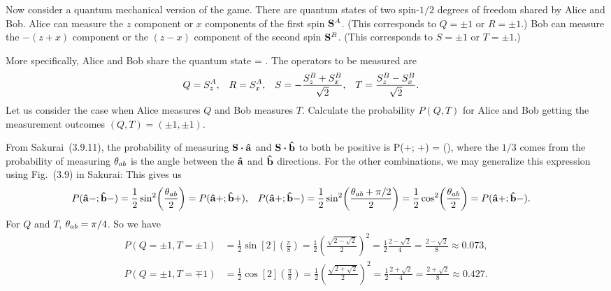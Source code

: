 \begin{problem}
	Now consider a quantum mechanical version of the game.  There are quantum states of two spin-$1/2$ degrees of freedom shared by Alice and Bob.  Alice can measure the $z$ component or $x$ components of the first spin $\vb{S}^A$.  (This corresponds to $Q = \pm1$ or $R = \pm1$.)  Bob can measure the $-(z+x)$ component or the $(z-x)$ component of the second spin $\vb{S}^B$.  (This corresponds to $S = \pm1$ or $T = \pm1$.)
	
	More specifically, Alice and Bob share the quantum state
	\beq
		\kpsi = .
	\eeq
	The operators to be measured are
	\begin{align*}
		Q &= S_z^A, &
		R &= S_x^A, &
		S &= -\frac{S_z^B + S_x^B}{\sqrt{2}}, &
		T &= \frac{S_z^B - S_x^B}{\sqrt{2}}.
	\end{align*}
	Let us consider the case when Alice measures $Q$ and Bob measures $T$.  Calculate the probability $P(Q, T)$ for Alice and Bob getting the measurement outcomes $(Q, T) = (\pm1, \pm1)$.
\end{problem}

\begin{solution}
	From Sakurai~(3.9.11), the probability of measuring $\vS \vdot \ah$ and $\vS \vdot \bh$ to both be positive is
	\beq
		P(\ah+; \bh+) =  \sin[2](),
	\eeq
	where the $1/3$ comes from the probability of measuring $\theta_{ab}$ is the angle between the $\vb{\hat{a}}$ and $\vb{\hat{b}}$ directions.  For the other combinations, we may generalize this expression using Fig.~(3.9) in Sakurai:
	This gives us
	\begin{align} \label{probs}
		P(\vb{\hat{a}}-; \vb{\hat{b}}-) &= \frac{1}{2} \sin[2](\frac{\theta_{ab}}{2}) = P(\vb{\hat{a}}+; \vb{\hat{b}}+), &
		P(\vb{\hat{a}}+; \vb{\hat{b}}-) &= \frac{1}{2} \sin[2](\frac{\theta_{ab} + \pi/2}{2}) = \frac{1}{2} \cos[2](\frac{\theta_{ab}}{2}) = P(\vb{\hat{a}}+; \vb{\hat{b}}-).
	\end{align}
	For $Q$ and $T$, $\theta_{ab} = \pi / 4$.  So we have
	\begin{align*}
		P(Q=\pm1, T=\pm1) &= \frac{1}{2} \sin[2](\frac{\pi}{8})
		= \frac{1}{2} \left( \frac{\sqrt{2 - \sqrt{2}}}{2} \right)^2
		= \frac{1}{2} \frac{2 - \sqrt{2}}{4}
		= \frac{2 - \sqrt{2}}{8}
		\approx 0.073, \\
		P(Q=\pm1, T=\mp1) &= \frac{1}{2} \cos[2](\frac{\pi}{8})
		= \frac{1}{2} \left( \frac{\sqrt{2 + \sqrt{2}}}{2} \right)^2
		= \frac{1}{2} \frac{2 + \sqrt{2}}{4}
		= \frac{2 + \sqrt{2}}{8}
		\approx 0.427.
	\end{align*}
	\vfix
\end{solution}



